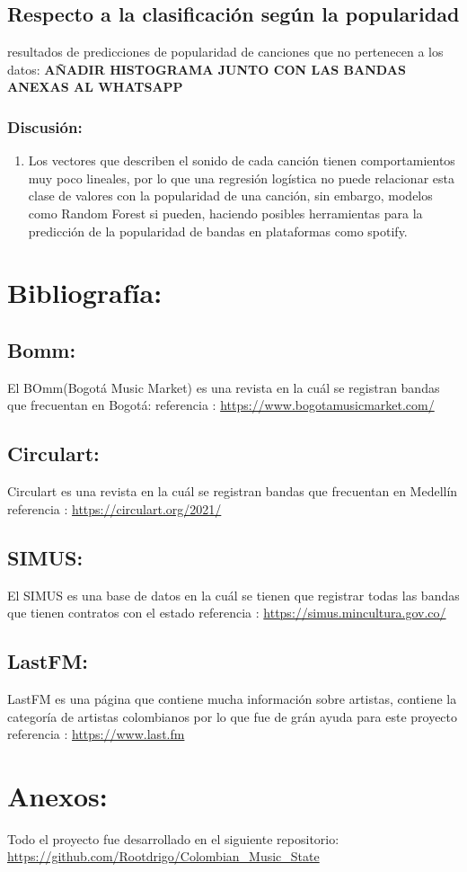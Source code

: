 \documentclass[11pt]{article}
\begin{document}
\subsection{Respecto a la clasificación según la popularidad}
\label{sec:org5e65efe}
resultados de predicciones de popularidad de canciones que no pertenecen a los
datos: \textbf{AÑADIR HISTOGRAMA JUNTO CON LAS BANDAS ANEXAS AL WHATSAPP}

\subsubsection{Discusión:}
\label{sec:org4fde0da}
\begin{enumerate}
\item Los vectores que describen el sonido de cada canción tienen comportamientos muy poco lineales, por lo que una regresión logística no puede relacionar esta clase de valores con la popularidad de una canción, sin embargo, modelos como Random Forest si pueden, haciendo posibles herramientas para la predicción de la popularidad de bandas en plataformas como spotify.
\end{enumerate}


\section{Bibliografía:}
\label{sec:orgdd42017}
\subsection{Bomm:}
\label{sec:org448b80c}
El BOmm(Bogotá Music Market) es una revista en la cuál se registran bandas que
frecuentan en Bogotá: referencia : \url{https://www.bogotamusicmarket.com/}
\subsection{Circulart:}
\label{sec:orgefaa56a}
Circulart es una revista en la cuál se registran bandas que frecuentan en
Medellín referencia :  \url{https://circulart.org/2021/}
\subsection{SIMUS:}
\label{sec:orgc9d2799}
El SIMUS es una base de datos en la cuál se tienen que registrar todas las
bandas que tienen contratos con el estado referencia :
\url{https://simus.mincultura.gov.co/}
\subsection{LastFM:}
\label{sec:org902ccd6}
LastFM es una página que contiene mucha información sobre artistas, contiene la
categoría de artistas colombianos por lo que fue de grán ayuda para este
proyecto referencia : \url{https://www.last.fm}

\section{Anexos:}
\label{sec:orgb342b31}

Todo el proyecto fue desarrollado en el siguiente repositorio:
\url{https://github.com/Rootdrigo/Colombian\_Music\_State}
\end{document}
